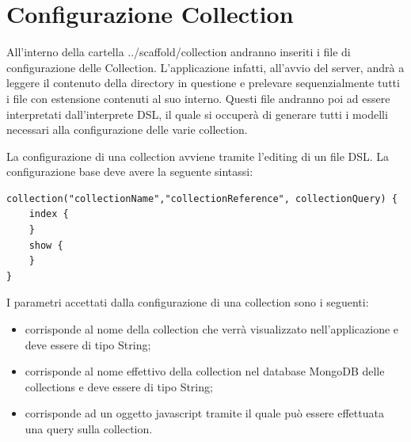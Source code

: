 \section{Configurazione Collection}

All'interno della cartella ../scaffold/collection andranno inseriti i file di configurazione delle Collection. L'applicazione infatti, all'avvio del server, andrà a leggere il contenuto della directory in questione e prelevare sequenzialmente tutti i file con estensione  contenuti al suo interno. Questi file andranno poi ad essere interpretati dall'interprete DSL, il quale si occuperà di generare tutti i modelli necessari alla configurazione delle varie collection.

La configurazione di una collection avviene tramite l'editing di un file DSL. La configurazione base deve avere la seguente sintassi:
\medskip
\begin{lstlisting}
collection("collectionName","collectionReference", collectionQuery) {
	index {
	}
	show {
	}
}		
\end{lstlisting}

I parametri accettati dalla configurazione di una collection sono i seguenti: 
\begin{itemize}
\item[]  corrisponde al nome della collection che verrà visualizzato nell'applicazione e deve essere di tipo String;
\item[]  corrisponde al nome effettivo della collection nel database MongoDB delle collections e deve essere di tipo String;
\item[]  corrisponde ad un oggetto javascript tramite il quale può essere effettuata una query sulla collection.
\end{itemize}

